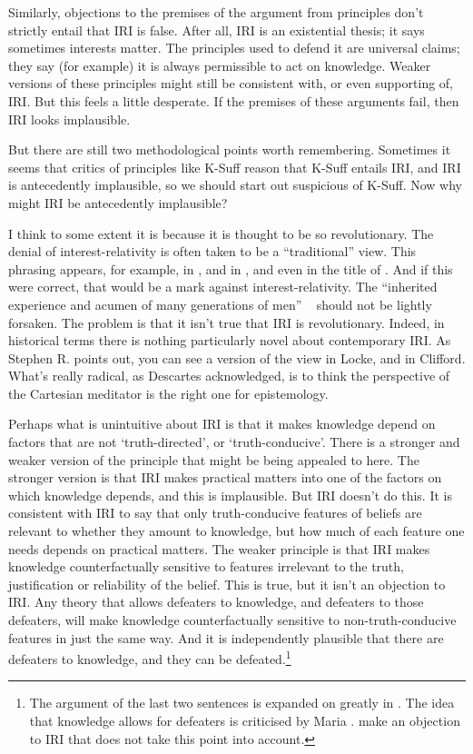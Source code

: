 Similarly, objections to the premises of the argument from principles don't strictly entail that IRI is false. After all, IRI is an existential thesis; it says sometimes interests matter. The principles used to defend it are universal claims; they say (for example) it is always permissible to act on knowledge. Weaker versions of these principles might still be consistent with, or even supporting of, IRI. But this feels a little desperate. If the premises of these arguments fail, then IRI looks implausible.

But there are still two methodological points worth remembering. Sometimes it seems that critics of principles like K-Suff reason that K-Suff entails IRI, and IRI is antecedently implausible, so we should start out suspicious of K-Suff. Now why might IRI be antecedently implausible? 

I think to some extent it is because it is thought to be so revolutionary. The denial of interest-relativity is often taken to be a ``traditional'' view. This phrasing appears, for example, in  \citet{Boyd2015}, and in  \citet{IchikawaEtAl2012}, and even in the title of  \citet{Buckwalter2014}. And if this were correct, that would be a mark against interest-relativity. The ``inherited experience and acumen of many generations of men'' ~\citep[11]{Austin1956} should not be lightly forsaken. The problem is that it isn't true that IRI is revolutionary. Indeed, in historical terms there is nothing particularly novel about contemporary IRI. As Stephen R.  \citet{Grimm2015} points out, you can see a version of the view in Locke, and in Clifford. What's really radical, as Descartes acknowledged, is to think the perspective of the Cartesian meditator is the right one for epistemology.

Perhaps what is unintuitive about IRI is that it makes knowledge depend on factors that are not `truth-directed', or `truth-conducive'. There is a stronger and weaker version of the principle that might be being appealed to here. The stronger version is that IRI makes practical matters into one of the factors on which knowledge depends, and this is implausible. But IRI doesn't do this. It is consistent with IRI to say that only truth-conducive features of beliefs are relevant to whether they amount to knowledge, but how much of each feature one needs depends on practical matters. The weaker principle is that IRI makes knowledge counterfactually sensitive to features irrelevant to the truth, justification or reliability of the belief. This is true, but it isn't an objection to IRI. Any theory that allows defeaters to knowledge, and defeaters to those defeaters, will make knowledge counterfactually sensitive to non-truth-conducive features in just the same way. And it is independently plausible that there are defeaters to knowledge, and they can be defeated.\footnote{The argument of the last two sentences is expanded on greatly in  \citet[§3]{Weatherson2014-ProbScept}. The idea that knowledge allows for defeaters is criticised by Maria  \citet{Lasonen-Aarnio2014a}.  \citet{EatonPickavance2015} make an objection to IRI that does not take this point into account.}

